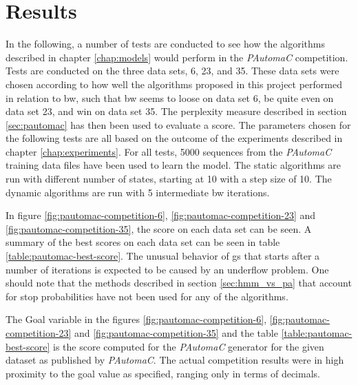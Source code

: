 \chapter{Results}
\label{chap:results}
In the following, a number of tests are conducted to see how the algorithms described in chapter \ref{chap:models} would perform in the \emph{PAutomaC} competition. Tests are conducted on the three data sets, 6, 23, and 35. These data sets were chosen according to how well the algorithms proposed in this project performed in relation to \gls{bw}, such that \gls{bw} seems to loose on data set 6, be quite even on data set 23, and win on data set 35.
The perplexity measure described in section \ref{sec:pautomac} has then been used to evaluate a score.
The parameters chosen for the following tests are all based on the outcome of the experiments described in chapter \ref{chap:experiments}.
For all tests, 5000 sequences from the \emph{PAutomaC} training data files have been used to learn the model. The static algorithms are run with different number of states, starting at 10 with a step size of 10.
The dynamic algorithms are run with 5 intermediate \gls{bw} iterations.

In figure \ref{fig:pautomac-competition-6}, \ref{fig:pautomac-competition-23} and \ref{fig:pautomac-competition-35}, the score on each data set can be seen.
A summary of the best scores on each data set can be seen in table \ref{table:pautomac-best-score}.
The unusual behavior of \gls{gs} that starts after a number of iterations is expected to be caused by an underflow problem.
One should note that the methods described in section \ref{sec:hmm_vs_pa} that account for stop probabilities have not been used for any of the algorithms.

The Goal variable in the figures \ref{fig:pautomac-competition-6}, \ref{fig:pautomac-competition-23} and \ref{fig:pautomac-competition-35} and the table \ref{table:pautomac-best-score} is the score computed for the \emph{PAutomaC} generator for the given dataset as published by \emph{PAutomaC}. The actual competition results were in high proximity to the goal value as specified, ranging only in terms of decimals.


